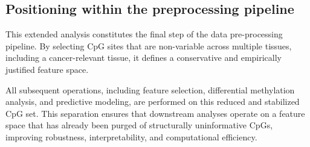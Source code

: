 \documentclass[10pt]{extarticle}
\begin{document}
\subsection{Positioning within the preprocessing pipeline}

This extended analysis constitutes the final step of the data pre-processing pipeline. By selecting CpG sites that are non-variable across multiple tissues, including a cancer-relevant tissue, it defines a conservative and empirically justified feature space.

All subsequent operations, including feature selection, differential methylation analysis, and predictive modeling, are performed on this reduced and stabilized CpG set. This separation ensures that downstream analyses operate on a feature space that has already been purged of structurally uninformative CpGs, improving robustness, interpretability, and computational efficiency.


\printbibliography
\end{document}
